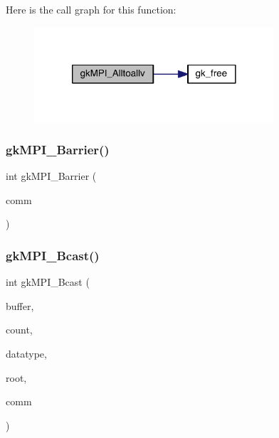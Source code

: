 Here is the call graph for this function\+:\nopagebreak
\begin{figure}[H]
\begin{center}
\leavevmode
\includegraphics[width=252pt]{a00951_ae0651b090fd2a6a021996fc1998a429c_cgraph}
\end{center}
\end{figure}
\mbox{\label{a00951_a1edf33502a17ee84cb573dc0bd989bda}} 
\subsubsection{\texorpdfstring{gk\+M\+P\+I\+\_\+\+Barrier()}{gkMPI\_Barrier()}}
{\footnotesize\ttfamily int gk\+M\+P\+I\+\_\+\+Barrier (\begin{DoxyParamCaption}\item[{M\+P\+I\+\_\+\+Comm}]{comm }\end{DoxyParamCaption})}

\mbox{\label{a00951_a22d90d341b85ea6b900bae0a5f9a8b71}} 
\subsubsection{\texorpdfstring{gk\+M\+P\+I\+\_\+\+Bcast()}{gkMPI\_Bcast()}}
{\footnotesize\ttfamily int gk\+M\+P\+I\+\_\+\+Bcast (\begin{DoxyParamCaption}\item[{void $\ast$}]{buffer,  }\item[{\hyperlink{a00876_aaa5262be3e700770163401acb0150f52}{idx\+\_\+t}}]{count,  }\item[{M\+P\+I\+\_\+\+Datatype}]{datatype,  }\item[{\hyperlink{a00876_aaa5262be3e700770163401acb0150f52}{idx\+\_\+t}}]{root,  }\item[{M\+P\+I\+\_\+\+Comm}]{comm }\end{DoxyParamCaption})}


